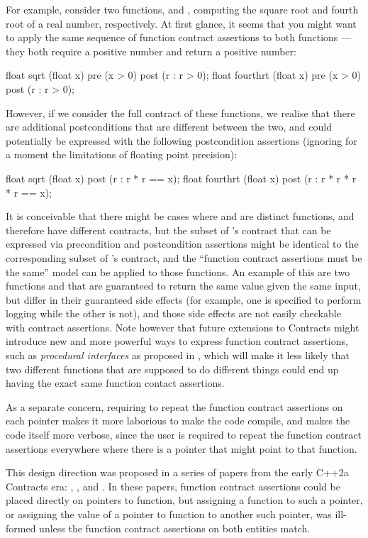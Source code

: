 For example, consider two functions,  and , computing the square root and fourth root of a real number, respectively. At first glance, it seems that you might want to apply the same sequence of function contract assertions to both functions --- they both require a positive number and return a positive number:
\begin{codeblock}
float sqrt (float x)     pre (x > 0) post (r : r > 0);
float fourthrt (float x) pre (x > 0) post (r : r > 0);
\end{codeblock}
However, if we consider the full contract of these functions, we realise that there are additional postconditions that are different between the two, and could potentially be expressed with the following postcondition assertions (ignoring for a moment the limitations of floating point precision):
\begin{codeblock}
float sqrt (float x) post (r : r * r == x);
float fourthrt (float x) post (r : r * r * r * r == x);
\end{codeblock}
It is conceivable that there might be cases where  and  are distinct functions, and therefore have different contracts, but the subset of 's contract that can be expressed via precondition and postcondition assertions might be identical to the corresponding subset of 's contract, and the ``function contract assertions must be the same'' model can be applied to those functions. An example of this are two functions  and  that are guaranteed to return the same value given the same input, but differ in their guaranteed side effects (for example, one is specified to perform logging while the other is not), and those side effects are not easily checkable with contract assertions. Note however that future extensions to Contracts might introduce new and more powerful ways to express function contract assertions, such as \emph{procedural interfaces} as proposed in \cite{P0465R0}, which will make it less likely that two different functions that are supposed to do different things could end up having the exact same function contact assertions.

As a separate concern, requiring to repeat the function contract assertions on each pointer makes it more laborious to make the code compile, and makes the code itself more verbose, since the user is required to repeat the function contract assertions everywhere where there is a pointer that might point to that function.

This design direction was proposed in a series of papers from the early C++2a Contracts era: \cite{N4415}, \cite{P0287R0}, and \cite{P0380R0}. In these papers, function contract assertions could be placed directly on pointers to function, but assigning a function to such a pointer, or assigning the value of a pointer to function to another such pointer, was ill-formed unless the function contract assertions on both entities match.

